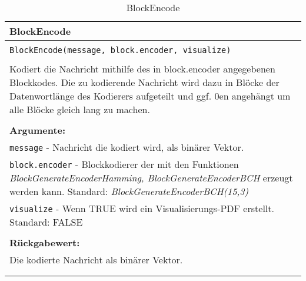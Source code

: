 \begin{longtable}{|p{\textwidth}|}
\hline
\rowcolor{lightblue}BlockEncode\\
\hline
\\
\texttt{BlockEncode(message, block.encoder, visualize)}\\
\\
Kodiert die Nachricht mithilfe des in block.encoder angegebenen Blockkodes. Die zu kodierende Nachricht wird dazu in Blöcke der Datenwortlänge des Kodierers aufgeteilt und ggf. 0en angehängt um alle Blöcke gleich lang zu machen. \\
\\
\textbf{Argumente:}\\
\texttt{message} - Nachricht die kodiert wird, als binärer Vektor.\\
\texttt{block.encoder} - Blockkodierer der mit den Funktionen \emph{BlockGenerateEncoderHamming, BlockGenerateEncoderBCH} erzeugt werden kann. Standard: \emph{BlockGenerateEncoderBCH(15,3)}\\
\texttt{visualize} - Wenn TRUE wird ein Visualisierungs-PDF erstellt. Standard: FALSE\\
\\
\textbf{Rückgabewert:}\\
Die kodierte Nachricht als binärer Vektor.\\
\\
\hline
\caption{BlockEncode}
\end{longtable}